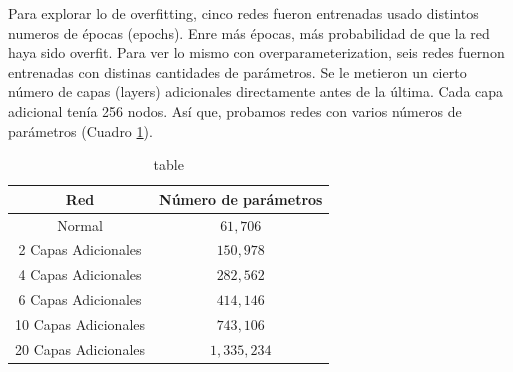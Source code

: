 Para explorar lo de overfitting, cinco redes fueron entrenadas usado distintos numeros de épocas (epochs). Enre más épocas, más probabilidad de que la red haya sido overfit. Para ver lo mismo con overparameterization, seis redes fuernon entrenadas con distinas cantidades de parámetros. Se le metieron un cierto número de capas (layers) adicionales directamente antes de la última. Cada capa adicional tenía 256 nodos. Así que, probamos redes con varios números de parámetros (Cuadro \ref{overparam_table}).

\begin{table}[h]
    \centering
    \begin{tabular}{|c|c|}
     \hline
     Red & Número de parámetros  \\ 
     \hline
     Normal & $61,706$  \\ 
     \hline
     2 Capas Adicionales & $150,978$  \\ 
     \hline
     4 Capas Adicionales & $282,562$  \\ 
     \hline
     6 Capas Adicionales & $414,146$  \\ 
     \hline
     10 Capas Adicionales & $743,106$  \\ 
     \hline
     20 Capas Adicionales & $1,335,234$  \\ 
     \hline
    \end{tabular}
    \caption{table}
    \label{overparam_table}
\end{table}

